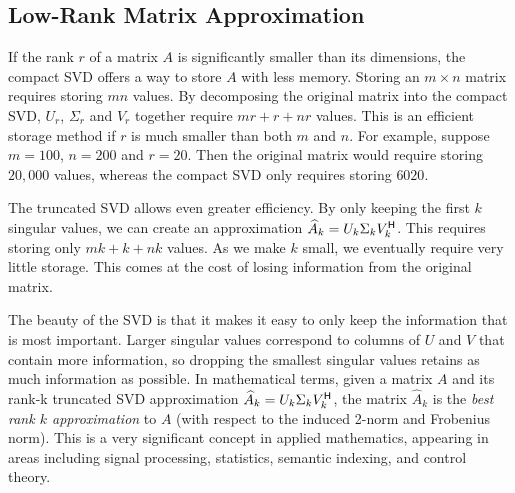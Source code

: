\subsection*{Low-Rank Matrix Approximation}
If the rank $r$ of a matrix $A$ is significantly smaller than its dimensions, the compact SVD offers a way to store $A$ with less memory.
Storing an $m\times n$ matrix requires storing $mn$ values.
By decomposing the original matrix into the compact SVD, $U_r$, $\Sigma_r$ and $V_r$ together require $mr+r+nr$ values.
This is an efficient storage method if $r$ is much smaller than both $m$ and $n$.
For example, suppose $m=100$, $n=200$ and $r=20$.
Then the original matrix would require storing $20,000$ values, whereas the compact SVD only requires storing $6020$.

The truncated SVD allows even greater efficiency.
By only keeping the first $k$ singular values, we can create an approximation $\widehat A_k = U_k\Sigma_k V_k^{\mathsf H}$.
This requires storing only $mk+k+nk$ values.
As we make $k$ small, we eventually require very little storage. This comes at the cost of losing information from the original matrix.

The beauty of the SVD is that it makes it easy to only keep the information that is most important.
Larger singular values correspond to columns of $U$ and $V$ that contain more information, so dropping the smallest singular values retains as much information as possible.
In mathematical terms, given a matrix $A$ and its rank-k truncated SVD approximation $\widehat A_k = U_k\Sigma_k V_k^{\mathsf H}$, the matrix $\widehat A_k$ is the \emph{best rank $k$ approximation} to $A$ (with respect to the induced 2-norm and Frobenius norm).
This is a very significant concept in applied mathematics, appearing in areas including signal processing, statistics, semantic indexing, and control theory.

